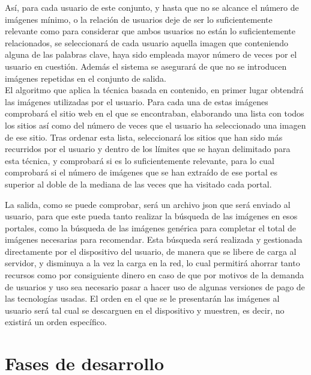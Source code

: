 Así, para cada usuario de este conjunto, y hasta que no se alcance el número de imágenes mínimo, o la relación de usuarios deje de ser lo suficientemente relevante como para considerar que ambos usuarios no están lo suficientemente relacionados, se seleccionará de cada usuario aquella imagen que conteniendo alguna de las palabras clave, haya sido empleada mayor número de veces por el usuario en cuestión. Además el sistema se asegurará de que no se introducen imágenes repetidas en el conjunto de salida.\\




El algoritmo que aplica la técnica basada en contenido, en primer lugar obtendrá las imágenes utilizadas por el usuario. Para cada una de estas imágenes comprobará el sitio web en el que se encontraban, elaborando una lista con todos los sitios así como del número de veces que el usuario ha seleccionado una imagen de ese sitio. Tras ordenar esta lista, seleccionará los sitios que han sido más recurridos por el usuario y dentro de los límites que se hayan delimitado para esta técnica, y comprobará si es lo suficientemente relevante, para lo cual comprobará si el número de imágenes que se han extraído de ese portal es superior al doble de la mediana de las veces que ha visitado cada portal.


La salida, como se puede comprobar, será un archivo json que será enviado al usuario, para que este pueda tanto realizar la búsqueda de las imágenes en esos portales, como la búsqueda de las imágenes genérica para completar el total de imágenes necesarias para recomendar. Esta búsqueda será realizada y gestionada directamente por el dispositivo del usuario, de manera que se libere de carga al servidor, y disminuya a la vez la carga en la red, lo cual permitirá ahorrar tanto recursos como por consiguiente dinero en caso de que por motivos de la demanda de usuarios y uso sea necesario pasar a hacer uso de algunas versiones de pago de las tecnologías usadas. El orden en el que se le presentarán las imágenes al usuario será tal cual se descarguen en el dispositivo y muestren, es decir, no existirá un orden específico.

\section{Fases de desarrollo}

